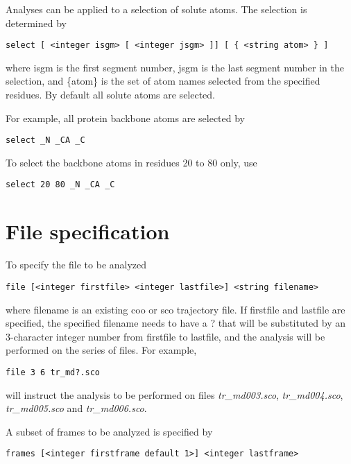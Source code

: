 Analyses can be applied to a selection of solute atoms. The selection
is determined by

\begin{verbatim}
select [ <integer isgm> [ <integer jsgm> ]] [ { <string atom> } ]
\end{verbatim}

where {\rm isgm} is the first segment number, {\rm jsgm} is the last 
segment number in the selection, and {\rm \{atom\}} is the set of atom
names selected from the specified residues. By default all solute
atoms are selected.
\par
For example, all protein backbone atoms are selected by

\begin{verbatim}
select _N _CA _C
\end{verbatim}

To select the backbone atoms in residues 20 to 80 only, use

\begin{verbatim}
select 20 80 _N _CA _C
\end{verbatim}

\section{File specification}

To specify the file to be analyzed

\begin{verbatim}
file [<integer firstfile> <integer lastfile>] <string filename>
\end{verbatim}

where {\rm filename} is an existing {\rm coo} or {\rm sco} trajectory file.
If {\rm firstfile} and {\rm lastfile} are specified, the specified
{\rm filename} needs to have a {\rm ?} that will be substituted by
an 3-character integer number from {\rm firstfile} to {\rm lastfile},
and the analysis will be performed on the series of files.
For example,

\begin{verbatim}
file 3 6 tr_md?.sco
\end{verbatim}

will instruct the analysis to be performed on files {\it tr\_md003.sco},
{\it tr\_md004.sco}, {\it tr\_md005.sco} and {\it tr\_md006.sco}.

\par
A subset of frames to be analyzed is specified by

\begin{verbatim}
frames [<integer firstframe default 1>] <integer lastframe>
\end{verbatim}

